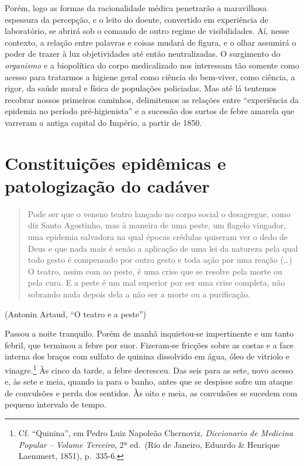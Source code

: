 Porém, logo as formas da racionalidade médica penetrarão a maravilhosa
espessura da percepção, e o leito do doente, convertido em experiência
de laboratório, se abrirá sob o comando de outro regime de
visibilidades. Aí, nesse contexto, a relação entre palavras e coisas
mudará de figura, e o olhar assumirá o poder de trazer à luz
objetividades até então neutralizadas. O surgimento do \emph{organismo}
e a biopolítica do corpo medicalizado nos interessam tão somente como
acesso para tratarmos a higiene geral como ciência do bem-viver, como
ciência, a rigor, da saúde moral e física de populações policiadas. Mas
até lá tentemos recobrar nossos primeiros caminhos, delimitemos as
relações entre ``experiência da epidemia no período pré-higienista'' e a
sucessão dos surtos de febre amarela que varreram a antiga capital do
Império, a partir de 1850.

\hypertarget{constituiuxe7uxf5es-epiduxeamicas-e-patologizauxe7uxe3o-do-caduxe1ver}{%
\section{Constituições epidêmicas e patologização do
cadáver}\label{constituiuxe7uxf5es-epiduxeamicas-e-patologizauxe7uxe3o-do-caduxe1ver}}

\begin{quote}
Pode ser que o veneno teatro lançado no corpo social o desagregue, como
diz Santo Agostinho, mas à maneira de uma peste, um flagelo vingador,
uma epidemia salvadora na qual épocas crédulas quiseram ver o dedo de
Deus e que nada mais é senão a aplicação de uma lei da natureza pela
qual todo gesto é compensado por outro gesto e toda ação por uma reação
(\ldots{}) O teatro, assim com ao peste, é uma crise que se resolve pela
morte ou pela cura. E a peste é um mal superior por ser uma crise
completa, não sobrando nada depois dela a não ser a morte ou a
purificação.
\end{quote}

(Antonin Artaud, ``O teatro e a peste'')

Passou a noite tranquilo. Porém de manhã inquietou-se impertinente e um
tanto febril, que terminou a febre por suor. Fizeram-se fricções sobre
as costas e a face interna dos braços com sulfato de quinina dissolvido
em água, óleo de vitriolo e vinagre.\footnote{Cf. ``Quinina'', em Pedro
  Luiz Napoleão Chernoviz, \emph{Diccionario de Medicina Popular} --
  \emph{Volume Terceiro}, 2ª ed.~(Rio de Janeiro, Eduardo \& Henrique
  Laemmert, 1851), p.~335-6.} Às cinco da tarde, a febre decresceu. Das
seis para as sete, novo acesso e, às sete e meia, quando ia para o
banho, antes que se despisse sofre um ataque de convulsões e perda dos
sentidos. Às oito e meia, as convulsões se sucedem com pequeno intervalo
de tempo.

